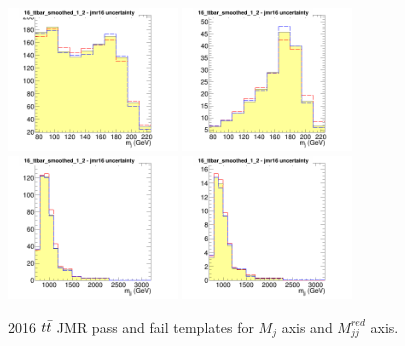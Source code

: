 \begin{figure}[!htb]
	\centering
	\includegraphics[width=0.4\textwidth]{Figures/Uncertainty_16_ttbar_smoothed_1_2_jmr16failX.png}
	\includegraphics[width=0.4\textwidth]{Figures/Uncertainty_16_ttbar_smoothed_1_2_jmr16passX.png}
	\includegraphics[width=0.4\textwidth]{Figures/Uncertainty_16_ttbar_smoothed_1_2_jmr16failY.png}
	\includegraphics[width=0.4\textwidth]{Figures/Uncertainty_16_ttbar_smoothed_1_2_jmr16passY.png}
	\caption{2016 $t\bar{t} $ JMR pass and fail templates for $M_j$ axis and $M_{jj}^{red}$ axis.}
	\label{fig:jerttbarAppend}
\end{figure}

